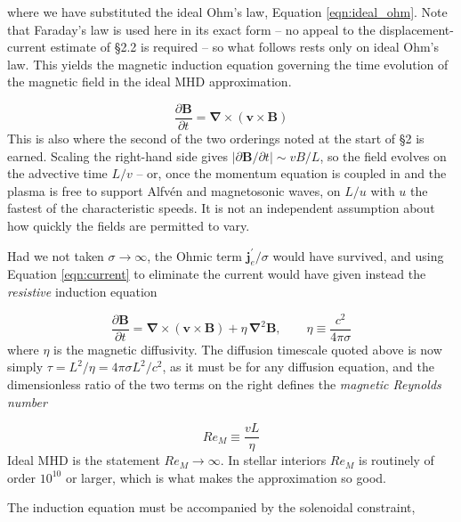 \documentclass[notoc]{tufte-handout}
\renewcommand{\vec}[1]{\mathbf{#1}}
\newcommand{\del}{\vec{\nabla}}
\newcommand{\B}{\vec{B}}
\begin{document}
where we have substituted the ideal Ohm's law, Equation \ref{eqn:ideal_ohm}. Note that Faraday's law is used here in its exact form -- no appeal to the displacement-current estimate of \S 2.2 is required -- so what follows rests only on ideal Ohm's law. This yields the magnetic induction equation governing the time evolution of the magnetic field in the ideal MHD approximation.

\begin{equation}
  \boxed{  \frac{\partial \B}{\partial t} = \del \times (\vec{v}\times \B ) }
\label{eqn:induction}
\end{equation}
%
This is also where the second of the two orderings noted at the start of \S 2 is earned. Scaling the right-hand side gives $|\partial \B / \partial t| \sim v B / L$, so the field evolves on the advective time $L/v$ -- or, once the momentum equation is coupled in and the plasma is free to support Alfv\'en and magnetosonic waves, on $L/u$ with $u$ the fastest of the characteristic speeds. It is not an independent assumption about how quickly the fields are permitted to vary.

Had we not taken $\sigma \to \infty$, the Ohmic term $\vec{j}_e^\prime/\sigma$ would have survived, and using Equation \ref{eqn:current} to eliminate the current would have given instead the {\it resistive} induction equation

\begin{equation}
\frac{\partial \B}{\partial t} = \del \times (\vec{v}\times \B ) + \eta \, \del^2 \B , \qquad \eta \equiv \frac{c^2}{4\pi\sigma}
\label{eqn:resistive_induction}
\end{equation}
%
where $\eta$ is the magnetic diffusivity. The diffusion timescale quoted above is now simply $\tau = L^2/\eta = 4\pi\sigma L^2/c^2$, as it must be for any diffusion equation, and the dimensionless ratio of the two terms on the right defines the {\it magnetic Reynolds number}

\begin{equation}
Re_M \equiv \frac{vL}{\eta}
\end{equation}
%
Ideal MHD is the statement $Re_M \rightarrow \infty$. In stellar interiors $Re_M$ is routinely of order $10^{10}$ or larger, which is what makes the approximation so good.

The induction equation must be accompanied by the solenoidal constraint,
\end{document}
